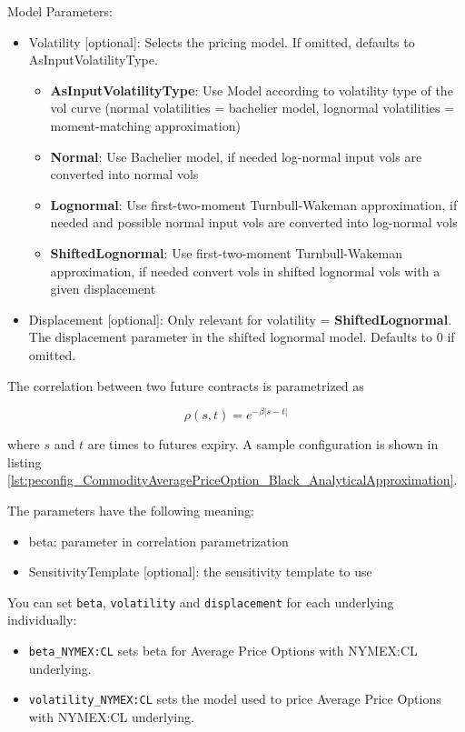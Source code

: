 Model Parameters:
\begin{itemize}
    \item Volatility [optional]: Selects the pricing model. If omitted, defaults to AsInputVolatilityType.
    \begin{itemize}
        \item \textbf{AsInputVolatilityType}: Use Model according to volatility type of the vol curve (normal volatilities = bachelier model, lognormal volatilities = moment-matching approximation)
        \item \textbf{Normal}: Use Bachelier model, if needed log-normal input vols are converted into normal vols
        \item \textbf{Lognormal}: Use first-two-moment Turnbull-Wakeman approximation, if needed and possible normal input vols are converted into log-normal vols
        \item \textbf{ShiftedLognormal}: Use first-two-moment Turnbull-Wakeman approximation, if needed convert vols in shifted lognormal vols with a given displacement
    \end{itemize}
    \item Displacement [optional]: Only relevant for volatility = \textbf{ShiftedLognormal}. The displacement parameter in the shifted lognormal model. Defaults to 0 if omitted.
\end{itemize}

The correlation between two future contracts is parametrized as

$$\rho(s, t) = e^{-\beta |s-t|}$$

where $s$ and $t$ are times to futures expiry. A sample configuration is shown in listing
\ref{lst:peconfig_CommodityAveragePriceOption_Black_AnalyticalApproximation}.

The parameters have the following meaning:

\begin{itemize}
\item beta: parameter in correlation parametrization
\item SensitivityTemplate [optional]: the sensitivity template to use
\end{itemize}

You can set \texttt{beta}, \texttt{volatility} and \texttt{displacement} for each underlying individually:
\begin{itemize}
    \item \texttt{beta\_NYMEX:CL} sets beta for Average Price Options with NYMEX:CL underlying.
    \item \texttt{volatility\_NYMEX:CL} sets the model used to price Average Price Options with NYMEX:CL underlying.
\end{itemize}

